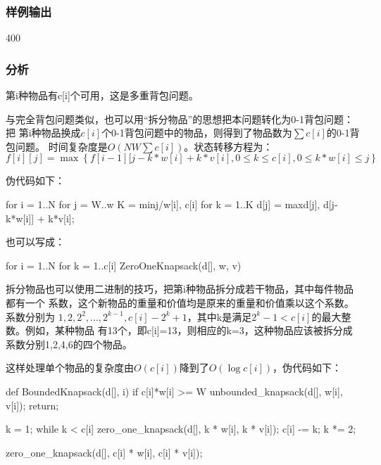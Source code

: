 \subsubsection{样例输出}
\begin{Code}
400
\end{Code}

\subsubsection{分析}
第i种物品有c[i]个可用，这是多重背包问题。

与完全背包问题类似，也可以用“拆分物品”的思想把本问题转化为0-1背包问题：把
第i种物品换成$c[i]$个0-1背包问题中的物品，则得到了物品数为$\sum c[i]$的0-1背包问题。
时间复杂度是$O(NW\sum c[i])$。状态转移方程为：
$$f[i][j]=\max\left\{f[i-1][j-k*w[i]+k*v[i], 0 \leq k \leq c[i], 0 \leq k*w[i] \leq j\right\}$$

伪代码如下：
\begin{Code}
for i = 1..N
    for j = W..w
        K = min{j/w[i], c[i]}
        for k = 1..K
            d[j] = max{d[j], d[j-k*w[i]] + k*v[i]};
\end{Code}

也可以写成：
\begin{Code}
for i = 1..N
    for k = 1..c[i]
        ZeroOneKnapsack(d[], w, v)
\end{Code}

拆分物品也可以使用二进制的技巧，把第i种物品拆分成若干物品，其中每件物品都有一个
系数，这个新物品的重量和价值均是原来的重量和价值乘以这个系数。系数分别为
$1,2,2^2,...,2^{k-1},c[i]-2^k+1$，其中k是满足$2^k-1<c[i]$的最大整数。例如，某种物品
有13个，即c[i]=13，则相应的k=3，这种物品应该被拆分成系数分别1,2,4,6的四个物品。

这样处理单个物品的复杂度由$O(c[i])$降到了$O(\log c[i])$，伪代码如下：
\begin{Code}
def BoundedKnapsack(d[], i)
    if c[i]*w[i] >= W
        unbounded_knapsack(d[], w[i], v[i]);
        return;

    k = 1;
    while k < c[i]
        zero_one_knapsack(d[], k * w[i], k * v[i]);
        c[i] -= k;
        k *= 2;

    zero_one_knapsack(d[], c[i] * w[i], c[i] * v[i]);
\end{Code}

